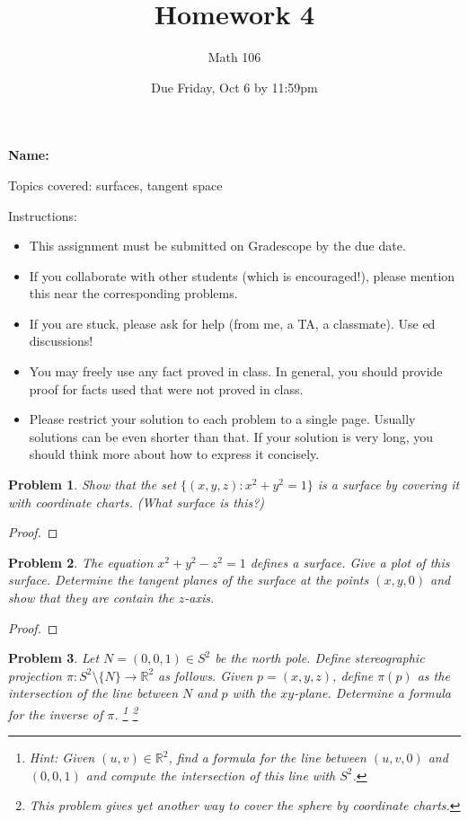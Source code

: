 \documentclass[11pt]{article}
\author{Math 106}
\date{Due Friday, Oct 6 by 11:59pm}
\title{Homework 4}
\newtheorem{problem}{Problem}
\begin{document}
\maketitle

{\bf\Large Name:} 


\vspace{.3in}
Topics covered: surfaces, tangent space

Instructions: 
\begin{itemize}
\item This assignment must be submitted on Gradescope by the due date. 
\item If you collaborate with other students (which is encouraged!), please mention this near the corresponding problems. 
\item If you are stuck, please ask for help (from me, a TA, a classmate). Use ed discussions!  
\item You may freely use any fact proved in class. In general, you should provide proof for facts used that were not proved in class. 
\item Please restrict your solution to each problem to a single page. Usually solutions can be even shorter than that. If your solution is very long, you should think more about how to express it concisely.
\end{itemize}
\pagebreak 


\begin{problem}
Show that the set $\{(x,y,z):x^2+y^2=1\}$ is a surface by covering it with coordinate charts. (What surface is this?)
\end{problem}

\begin{proof}

\end{proof}

\pagebreak 

\begin{problem}
The equation $x^2+y^2-z^2=1$ defines a surface. Give a plot of this surface. Determine the tangent planes of the surface at the points $(x,y,0)$ and show that they are contain the $z$-axis. 
\end{problem}

\begin{proof}

\end{proof}

\pagebreak 

\begin{problem}
Let $N=(0,0,1)\in S^2$ be the north pole. Define stereographic projection $\pi: S^2\setminus\{N\}\to \mathbb R^2$ as follows. Given $p=(x,y,z)$, define $\pi(p)$ as the intersection of the line between $N$ and $p$ with the $xy$-plane. Determine a formula for the inverse of $\pi$. \footnote{Hint: Given $(u,v)\in\mathbb R^2$, find a formula for the line between $(u,v,0)$ and $(0,0,1)$ and compute the intersection of this line with $S^2$.} \footnote{This problem gives yet another way to cover the sphere by coordinate charts.} 
\end{problem}
\end{document}
